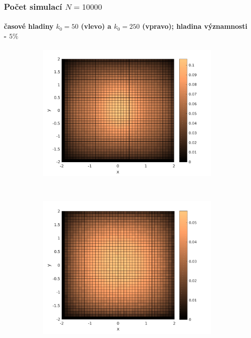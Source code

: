 \begin{frame}\frametitle{Počet simulací $N=10000$}
\framesubtitle{časové hladiny $k_{0}=50$ (vlevo) a $k_{0}=250$ (vpravo); hladina významnosti - $5 \%$}
\begin{figure}
    \centering
    \begin{subfigure}[t]{0.5\textwidth}
        \centering
        \includegraphics[width=1.05\linewidth]{../../results/simulations/10000/solutionErr/solutionError_sim10000_step01_time50_boundary2.pdf}
    \end{subfigure}%
    ~ 
    \begin{subfigure}[t]{0.5\textwidth}
        \centering
        \includegraphics[width=1\linewidth]{../../results/simulations/10000/solutionErr/solutionError_sim10000_step01_time250_boundary2.pdf}
    \end{subfigure}
\end{figure}
\end{frame}

